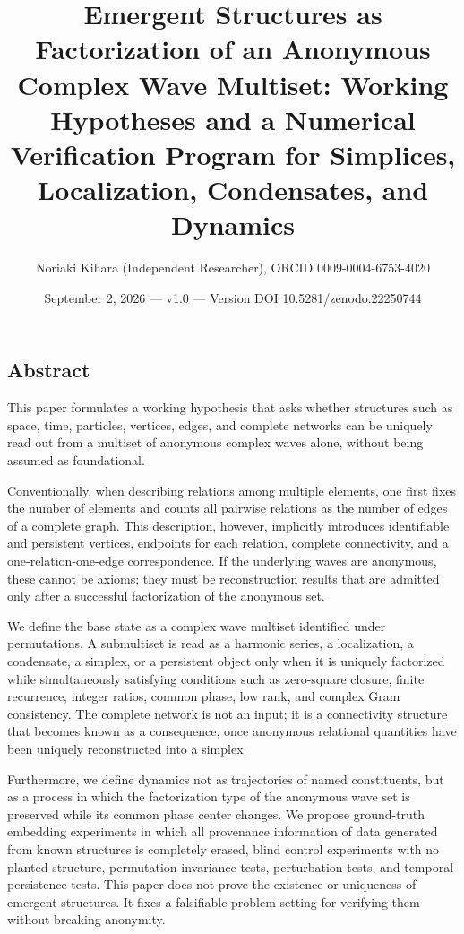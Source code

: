 \documentclass[
  a4paper,
]{article}
\title{Emergent Structures as Factorization of an Anonymous Complex Wave
Multiset: Working Hypotheses and a Numerical Verification Program for
Simplices, Localization, Condensates, and Dynamics}
\author{Noriaki Kihara (Independent Researcher), ORCID
0009-0004-6753-4020}
\date{September 2, 2026 --- v1.0 --- Version DOI
10.5281/zenodo.22250744}
\begin{document}
\maketitle

\subsection{Abstract}\label{abstract}

This paper formulates a working hypothesis that asks whether structures
such as space, time, particles, vertices, edges, and complete networks
can be uniquely read out from a multiset of anonymous complex waves
alone, without being assumed as foundational.

Conventionally, when describing relations among multiple elements, one
first fixes the number of elements and counts all pairwise relations as
the number of edges of a complete graph. This description, however,
implicitly introduces identifiable and persistent vertices, endpoints
for each relation, complete connectivity, and a one-relation-one-edge
correspondence. If the underlying waves are anonymous, these cannot be
axioms; they must be reconstruction results that are admitted only after
a successful factorization of the anonymous set.

We define the base state as a complex wave multiset identified under
permutations. A submultiset is read as a harmonic series, a
localization, a condensate, a simplex, or a persistent object only when
it is uniquely factorized while simultaneously satisfying conditions
such as zero-square closure, finite recurrence, integer ratios, common
phase, low rank, and complex Gram consistency. The complete network is
not an input; it is a connectivity structure that becomes known as a
consequence, once anonymous relational quantities have been uniquely
reconstructed into a simplex.

Furthermore, we define dynamics not as trajectories of named
constituents, but as a process in which the factorization type of the
anonymous wave set is preserved while its common phase center changes.
We propose ground-truth embedding experiments in which all provenance
information of data generated from known structures is completely
erased, blind control experiments with no planted structure,
permutation-invariance tests, perturbation tests, and temporal
persistence tests. This paper does not prove the existence or uniqueness
of emergent structures. It fixes a falsifiable problem setting for
verifying them without breaking anonymity.
\end{document}
